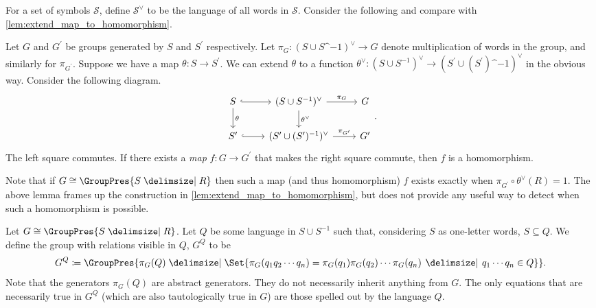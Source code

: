 For a set of symbols $\mathcal{S}$, define  $\mathcal{S}^\vee$ to be the language of all words in  $\mathcal{S}$.
Consider the following and compare with \cref{lem:extend_map_to_homomorphism}.

\begin{lemma}
	Let $G$ and $G^\prime$ be groups generated by $S$ and $S^\prime$ respectively. Let $\pi_G \colon (S \cup S\^{-1})^\vee \to G$ denote multiplication of words in the group, and similarly for $\pi_{G^\prime}$.
	Suppose we have a map  $\theta \colon S \to S^\prime$.
	We can extend $\theta$ to a function $\theta^\vee \colon (S \cup S^{-1})^\vee \to (S^\prime \cup (S^\prime)\^{-1})^\vee$ in the obvious way.
	Consider the following diagram.
	\[
		\begin{tikzcd}
			S \ar[d, "\theta"] \ar[r, hook] & (S \cup S^{-1})^\vee \ar[d, "\theta^\vee"] \ar[r, "\pi_G"] & G \\
			S^\prime \ar[r, hook] & (S^\prime \cup (S^\prime)^{-1})^\vee \ar[r, "\pi_{G^\prime}"] & G^\prime
		\end{tikzcd}
		.\]
	The left square commutes. If there exists a \emph{map} $f \colon G \to G^\prime$ that makes the right square commute, then $f$ is a homomorphism.
	\label{lem:homomorphism_squares}
\end{lemma}
\begin{remark}
	Note that if $G \cong \GroupPres{S \relations R}$ then such a map (and thus homomorphism) $f$ exists exactly when  $\pi_{G^\prime} \circ \theta^\vee (R) = 1$. The above lemma frames up the construction in \cref{lem:extend_map_to_homomorphism}, but does not provide any useful way to detect when such a homomorphism is possible.
	\label{rem:when_does_map_exist}
\end{remark}

\begin{definition}
	Let $G \cong \GroupPres{S \relations R}$. Let  $Q$ be some language in  $S \cup S^{-1}$ such that, considering  $S$ as one-letter words, $S \subseteq Q$. We define the group with relations visible in $Q$,  $G^Q$ to be
	\[
		G^Q \coloneqq \GroupPres{\pi_G(Q) \relations \Set{\pi_G(q_1q_2\cdots q_n) = \pi_G(q_1)\pi_G(q_2) \cdots \pi_G(q_n) \given q_1\cdots q_n \in Q} }
		.\]
	Note that the generators $\pi_G(Q)$ are abstract generators. They do not necessarily inherit anything from $G$. The only equations that are necessarily true in  $G^Q$ (which are also tautologically true in $G$) are those spelled out by the language $Q$.
	\label{def:group_relations_visible_in_Q}
\end{definition}

